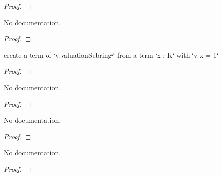 \begin{definition}
\begin{proof}
    \leanok
\end{proof}

\begin{theorem}\label{isUnit_in_valuationSubring_of_val_eq_one}
        \leanok
                No documentation.
    \end{theorem}

\begin{proof}
    \leanok
\end{proof}

\begin{theorem}\label{unitOfValOne_elem}
        \leanok
                create a term of `v.valuationSubringˣ` from a term `x : K` with `v x = 1`
    \end{theorem}

\begin{proof}
    \leanok
\end{proof}

\begin{theorem}\label{val_unitOfValOne_eq_one}
        \leanok
                No documentation.
    \end{theorem}

\begin{proof}
    \leanok
\end{proof}

\begin{theorem}\label{pow_Uniformizer_all}
        \leanok
                No documentation.
    \end{theorem}

\begin{proof}
    \leanok
\end{proof}

\begin{theorem}\label{pow_Uniformizer'}
        \leanok
                No documentation.
    \end{theorem}

\begin{proof}
    \leanok
\end{proof}


\end{definition}

